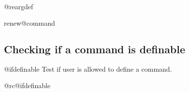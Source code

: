 %
\begin{docCommand}{@reargdef}{}
\begin{teX}
\long{}
\end{teX}
\end{docCommand}
%
\begin{teX}
\def\renewcommand{\@star@or@long\renew@command}
\end{teX}
%
\begin{docCommand}{renew@command} { }
\end{docCommand}
\begin{teX}
\def\renew@command#1{%
  \begingroup \escapechar\m@ne\xdef\@gtempa{{\string#1}}\endgroup
  \expandafter\@ifundefined\@gtempa
     {\@latex@error{\noexpand#1undefined}\@ehc}%
     \relax
  \let\@ifdefinable\@rc@ifdefinable
  \new@command#1}
\end{teX}




\subsection{Checking if a command is definable}
\begin{docCommand}{@ifdefinable}{ }
 Test if user is allowed to define a command.
\end{docCommand}

\begin{docCommand}{@rc@ifdefinable}{}
   
\end{docCommand}
\begin{teX}
\long\def\@ifdefinable #1#2{%
      \edef\reserved@a{\expandafter\@gobble\string #1}%
     \@ifundefined\reserved@a
         {\edef\reserved@b{\expandafter\@carcube \reserved@a xxx\@nil}%
          \ifx \reserved@b\@qend \@notdefinable\else
            \ifx \reserved@a\@qrelax \@notdefinable\else
              #2%
            \fi
          \fi}%
         \@notdefinable}
\end{teX}

